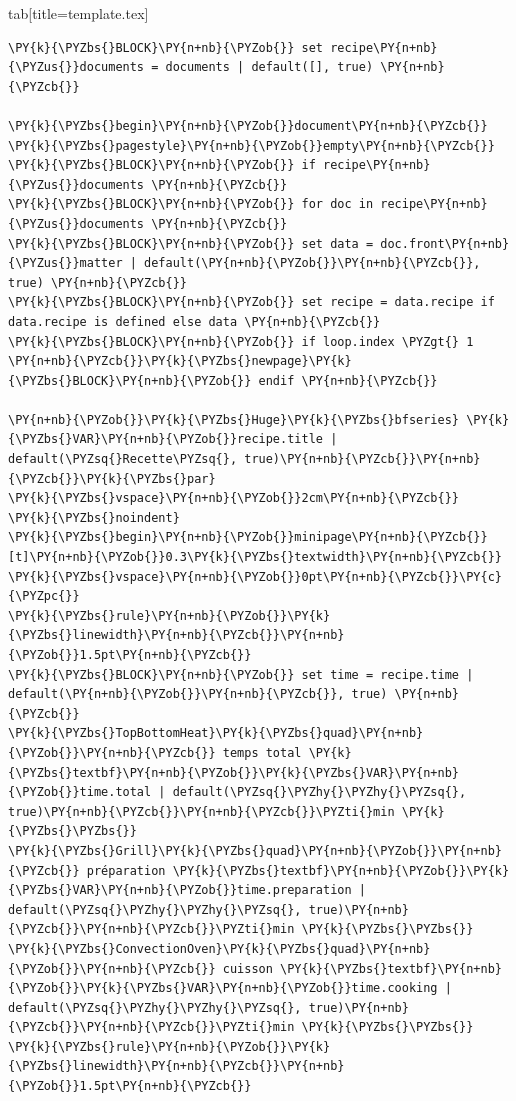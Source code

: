 \documentclass[a4paper,twoside]{article}
\begin{document}
\begin{tsdiv}{tab}[title=template.tex]
\begin{tscode}[lang=tex, engine=pygments]
\begin{Verbatim}[commandchars=\\\{\},breaklines, breakanywhere, commandchars=\\\{\}]
\PY{k}{\PYZbs{}BLOCK}\PY{n+nb}{\PYZob{}} set recipe\PY{n+nb}{\PYZus{}}documents = documents | default([], true) \PY{n+nb}{\PYZcb{}}

\PY{k}{\PYZbs{}begin}\PY{n+nb}{\PYZob{}}document\PY{n+nb}{\PYZcb{}}
\PY{k}{\PYZbs{}pagestyle}\PY{n+nb}{\PYZob{}}empty\PY{n+nb}{\PYZcb{}}
\PY{k}{\PYZbs{}BLOCK}\PY{n+nb}{\PYZob{}} if recipe\PY{n+nb}{\PYZus{}}documents \PY{n+nb}{\PYZcb{}}
\PY{k}{\PYZbs{}BLOCK}\PY{n+nb}{\PYZob{}} for doc in recipe\PY{n+nb}{\PYZus{}}documents \PY{n+nb}{\PYZcb{}}
\PY{k}{\PYZbs{}BLOCK}\PY{n+nb}{\PYZob{}} set data = doc.front\PY{n+nb}{\PYZus{}}matter | default(\PY{n+nb}{\PYZob{}}\PY{n+nb}{\PYZcb{}}, true) \PY{n+nb}{\PYZcb{}}
\PY{k}{\PYZbs{}BLOCK}\PY{n+nb}{\PYZob{}} set recipe = data.recipe if data.recipe is defined else data \PY{n+nb}{\PYZcb{}}
\PY{k}{\PYZbs{}BLOCK}\PY{n+nb}{\PYZob{}} if loop.index \PYZgt{} 1 \PY{n+nb}{\PYZcb{}}\PY{k}{\PYZbs{}newpage}\PY{k}{\PYZbs{}BLOCK}\PY{n+nb}{\PYZob{}} endif \PY{n+nb}{\PYZcb{}}

\PY{n+nb}{\PYZob{}}\PY{k}{\PYZbs{}Huge}\PY{k}{\PYZbs{}bfseries} \PY{k}{\PYZbs{}VAR}\PY{n+nb}{\PYZob{}}recipe.title | default(\PYZsq{}Recette\PYZsq{}, true)\PY{n+nb}{\PYZcb{}}\PY{n+nb}{\PYZcb{}}\PY{k}{\PYZbs{}par}
\PY{k}{\PYZbs{}vspace}\PY{n+nb}{\PYZob{}}2cm\PY{n+nb}{\PYZcb{}}
\PY{k}{\PYZbs{}noindent}
\PY{k}{\PYZbs{}begin}\PY{n+nb}{\PYZob{}}minipage\PY{n+nb}{\PYZcb{}}[t]\PY{n+nb}{\PYZob{}}0.3\PY{k}{\PYZbs{}textwidth}\PY{n+nb}{\PYZcb{}}
\PY{k}{\PYZbs{}vspace}\PY{n+nb}{\PYZob{}}0pt\PY{n+nb}{\PYZcb{}}\PY{c}{\PYZpc{}}
\PY{k}{\PYZbs{}rule}\PY{n+nb}{\PYZob{}}\PY{k}{\PYZbs{}linewidth}\PY{n+nb}{\PYZcb{}}\PY{n+nb}{\PYZob{}}1.5pt\PY{n+nb}{\PYZcb{}}
\PY{k}{\PYZbs{}BLOCK}\PY{n+nb}{\PYZob{}} set time = recipe.time | default(\PY{n+nb}{\PYZob{}}\PY{n+nb}{\PYZcb{}}, true) \PY{n+nb}{\PYZcb{}}
\PY{k}{\PYZbs{}TopBottomHeat}\PY{k}{\PYZbs{}quad}\PY{n+nb}{\PYZob{}}\PY{n+nb}{\PYZcb{}} temps total \PY{k}{\PYZbs{}textbf}\PY{n+nb}{\PYZob{}}\PY{k}{\PYZbs{}VAR}\PY{n+nb}{\PYZob{}}time.total | default(\PYZsq{}\PYZhy{}\PYZhy{}\PYZsq{}, true)\PY{n+nb}{\PYZcb{}}\PY{n+nb}{\PYZcb{}}\PYZti{}min \PY{k}{\PYZbs{}\PYZbs{}}
\PY{k}{\PYZbs{}Grill}\PY{k}{\PYZbs{}quad}\PY{n+nb}{\PYZob{}}\PY{n+nb}{\PYZcb{}} préparation \PY{k}{\PYZbs{}textbf}\PY{n+nb}{\PYZob{}}\PY{k}{\PYZbs{}VAR}\PY{n+nb}{\PYZob{}}time.preparation | default(\PYZsq{}\PYZhy{}\PYZhy{}\PYZsq{}, true)\PY{n+nb}{\PYZcb{}}\PY{n+nb}{\PYZcb{}}\PYZti{}min \PY{k}{\PYZbs{}\PYZbs{}}
\PY{k}{\PYZbs{}ConvectionOven}\PY{k}{\PYZbs{}quad}\PY{n+nb}{\PYZob{}}\PY{n+nb}{\PYZcb{}} cuisson \PY{k}{\PYZbs{}textbf}\PY{n+nb}{\PYZob{}}\PY{k}{\PYZbs{}VAR}\PY{n+nb}{\PYZob{}}time.cooking | default(\PYZsq{}\PYZhy{}\PYZhy{}\PYZsq{}, true)\PY{n+nb}{\PYZcb{}}\PY{n+nb}{\PYZcb{}}\PYZti{}min \PY{k}{\PYZbs{}\PYZbs{}}
\PY{k}{\PYZbs{}rule}\PY{n+nb}{\PYZob{}}\PY{k}{\PYZbs{}linewidth}\PY{n+nb}{\PYZcb{}}\PY{n+nb}{\PYZob{}}1.5pt\PY{n+nb}{\PYZcb{}}


\end{Verbatim}
\end{tscode}
\end{tsdiv}
\end{document}
